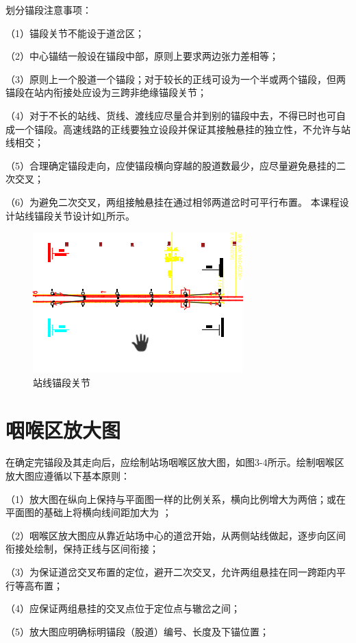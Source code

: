 划分锚段注意事项：

（1）锚段关节不能设于道岔区；

（2）中心锚结一般设在锚段中部，原则上要求两边张力差相等；

（3）原则上一个股道一个锚段；对于较长的正线可设为一个半或两个锚段，但两锚段在站内衔接处应设为三跨非绝缘锚段关节；

（4）对于不长的站线、货线、渡线应尽量合并到别的锚段中去，不得已时也可自成一个锚段。高速线路的正线要独立设段并保证其接触悬挂的独立性，不允许与站线相交；

（5）合理确定锚段走向，应使锚段横向穿越的股道数最少，应尽量避免悬挂的二次交叉；

（6）为避免二次交叉，两组接触悬挂在通过相邻两道岔时可平行布置。
本课程设计站线锚段关节设计如\ref{fig:站线锚段关节}所示。
\begin{figure}[H]
	\centering
	\includegraphics[width=0.7\linewidth]{figures/站线锚段关节}
	\caption{站线锚段关节}
	\label{fig:站线锚段关节}
\end{figure}

\section{咽喉区放大图}
在确定完锚段及其走向后，应绘制站场咽喉区放大图，如图3-4所示。绘制咽喉区放大图应遵循以下基本原则：

（1）放大图在纵向上保持与平面图一样的比例关系，横向比例增大为两倍；或在平面图的基础上将横向线间距加大为 ；

（2）咽喉区放大图应从靠近站场中心的道岔开始，从两侧站线做起，逐步向区间衔接处绘制，保持正线与区间衔接；

（3）为保证道岔交叉布置的定位，避开二次交叉，允许两组悬挂在同一跨距内平行等高布置；

（4）应保证两组悬挂的交叉点位于定位点与辙岔之间；

（5）放大图应明确标明锚段（股道）编号、长度及下锚位置；

